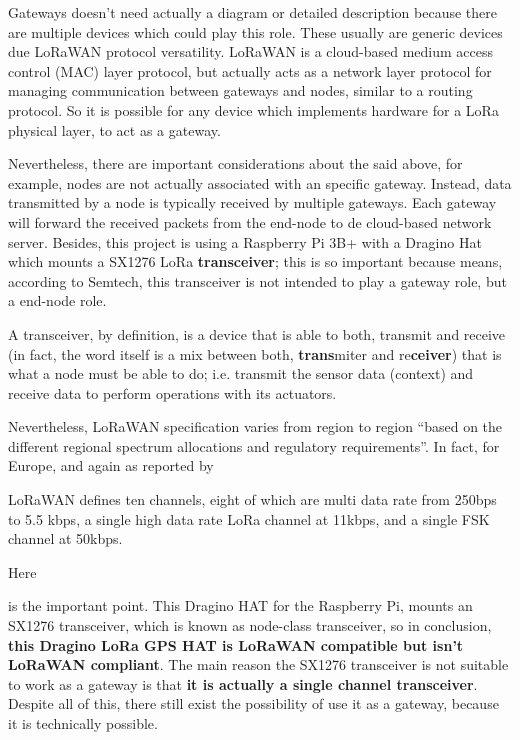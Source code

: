 \documentclass[11pt,a4paper,dvipsnames,twoside]{article}
\newcounter{subsubsubsection}[subsubsection]
\begin{document}
Gateways doesn't need actually a diagram or detailed description because there are multiple devices which could play this role. These usually are generic devices due LoRaWAN protocol versatility. LoRaWAN is a cloud-based medium access control (MAC) layer protocol, but actually acts as a network layer protocol for managing communication between gateways and nodes, similar to a routing protocol. So it is possible for any device which implements hardware for a LoRa physical layer, to act as a gateway.

Nevertheless, there are important considerations about the said above, for example, nodes are not actually associated with an specific gateway. Instead, data transmitted by a node is typically received by multiple gateways. Each gateway will forward the received packets from the end-node to de cloud-based network server. Besides, this project is using a Raspberry Pi 3B+ with a Dragino Hat which mounts a SX1276 LoRa \textbf{transceiver}\cite{SX1276}; this is so important because means, according to Semtech, this transceiver is not intended to play a gateway role, but a end-node role.

A transceiver, by definition, is a device that is able to both, transmit and receive (in fact, the word itself is a mix between both, \textbf{trans}miter and re\textbf{ceiver}) that is what a node must be able to do; i.e. transmit the sensor data (context) and receive data to perform operations with its actuators. 

Nevertheless, LoRaWAN specification varies from region to region \enquote{based on
the different regional spectrum allocations and regulatory requirements}\cite[p.~12]{LoRaWANspec}. In fact, for Europe, and again as reported by \cite[p.~13]{LoRaWANspec} 

\begin{quoting}
LoRaWAN defines ten channels, eight of which are multi data rate from 250bps to
5.5 kbps, a single high data rate LoRa channel at 11kbps, and a single FSK channel
at 50kbps.
\end{quoting}

\hypertarget{Raspi_HAT}{Here} is the important point. This Dragino HAT for the Raspberry Pi, mounts an SX1276 transceiver, which is known as node-class transceiver, so in conclusion, \textbf{this Dragino LoRa GPS HAT is LoRaWAN compatible but isn't LoRaWAN compliant}. The main reason the SX1276 transceiver is not suitable to work as a gateway is that \textbf{it is actually a single channel transceiver}. Despite all of this, there still exist the possibility of use it as a gateway, because it is technically possible.
\end{document}
